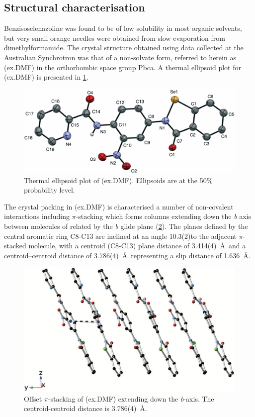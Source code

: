 \begin{refsection}
\subsection{Structural characterisation}
Benzisoselenazoline  was found to be of low solubility in most organic solvents, but very small orange needles were obtained from slow evaporation from dimethylformamide.
The crystal structure obtained using data collected at the Australian Synchrotron was that of a non-solvate form, referred to herein as (ex.DMF) in the orthorhombic space group Pbca. 
A thermal ellipsoid plot for (ex.DMF) is presented in \cref{fig:ebs-nitroamide-2py-dmf-xtal}.

\begin{figure}
    \centering
    \includegraphics[width=0.8\linewidth]{Figures/ebs-nitroamide-2py-dmf-xtal.pdf}
    \caption{Thermal ellipsoid plot of (ex.DMF). Ellipsoids are at the 50\% probability level.}
    \label{fig:ebs-nitroamide-2py-dmf-xtal}
\end{figure}

The crystal packing in (ex.DMF) is characterised a number of non-covalent interactions including $\pi$-stacking which forms columns extending down the \emph{b} axis between molecules of  related by the \emph{b} glide plane (\cref{fig:ebs-nitroamide-2py-packing}). 
The planes defined by the central aromatic ring C8-C13 are inclined at an angle 10.3(2)\degree to the adjacent $\pi$-stacked molecule, with a centroid (C8-C13) plane distance of 3.414(4)~\AA~and a centroid–centroid distance of 3.786(4)~\AA~representing a slip distance of 1.636~\AA.

\begin{figure}
    \centering
    \includegraphics[width=0.8\linewidth]{Figures/ebs-nitroamide-2py-packing.pdf}
    \caption{Offset $\pi$-stacking of (ex.DMF) extending down the \emph{b}-axis. The centroid-centroid distance is 3.786(4)~\AA.}
    \label{fig:ebs-nitroamide-2py-packing}
\end{figure}


\end{refsection}
